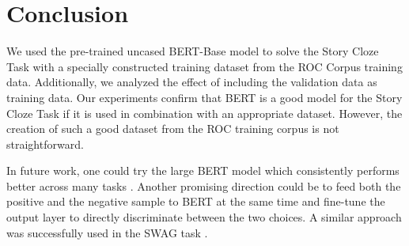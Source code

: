 \documentclass{article}
\begin{document}
\section{Conclusion}
We used the pre-trained uncased BERT-Base model to solve the Story Cloze Task with a specially constructed training dataset from the ROC Corpus training data.
Additionally, we analyzed the effect of including the validation data as training data.
Our experiments confirm that BERT is a good model for the Story Cloze Task if it is used in combination with an appropriate dataset.
However, the creation of such a good dataset from the ROC training corpus is not straightforward.

In future work, one could try the large BERT model which consistently performs better across many tasks \cite{BERT}. Another promising direction could be to feed both the positive and the negative sample to BERT at the same time and fine-tune the output layer to directly discriminate between the two choices. A similar approach was successfully used in the SWAG task \cite{BERT}.



\end{document}
